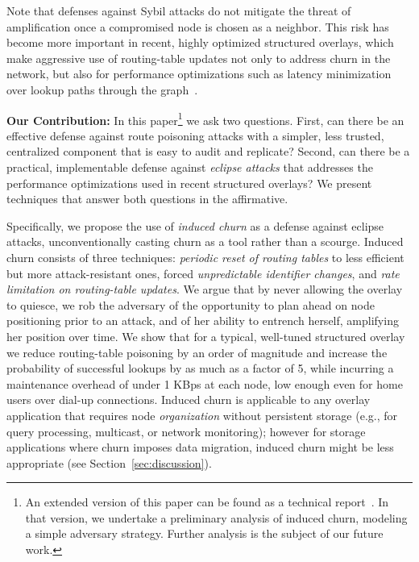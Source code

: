 \documentclass[10pt,twocolumn]{article}
\renewcommand{\paragraph}[1]{\textbf{#1:}}
\begin{document}
Note that defenses against Sybil attacks do not mitigate the threat of
amplification once a compromised node is chosen as a neighbor.  This
risk has become more important in recent, highly optimized structured overlays,
which make aggressive use of routing-table updates not only to address
churn in the network,
but also for performance optimizations such as latency
minimization over lookup paths through the graph~\cite{Gummadi2003b,Rhea2004}.

\paragraph{Our Contribution}
In this paper\footnote{An extended version of this paper can be found as
  a technical report~\cite{Condie:EECS-2005-11}.  In that version, we
  undertake a
  preliminary analysis of induced churn, modeling a simple adversary
  strategy.  Further analysis is the subject of our future work.} we ask
  two questions.  First, can there be an
effective defense against route poisoning attacks with a simpler, less trusted,
 centralized component that is easy to audit and replicate? Second, can
there be a practical, implementable defense against \emph{eclipse attacks} that
addresses the performance optimizations used in recent structured overlays?  We
present techniques that answer both questions in the affirmative.

Specifically, we propose the use of \emph{induced churn}
as a defense against eclipse attacks, unconventionally casting churn as
a tool rather than a scourge.  Induced churn consists of three
techniques: \emph{periodic reset of routing tables} to less efficient but more
attack-resistant ones,  forced \emph{unpredictable identifier changes},
and \emph{rate limitation on routing-table updates}.  We argue that by never allowing the overlay to
quiesce, we rob the adversary of the opportunity to plan ahead on node
positioning prior to an attack, and of her
ability to entrench herself, amplifying her position over time.
We show that for a typical, well-tuned structured overlay we reduce
routing-table poisoning by an order of magnitude and increase the
probability of successful lookups by as much as a factor
of 5, while incurring a maintenance overhead of under 1 KBps at each
node, low enough even for home users over dial-up connections.
Induced churn is applicable to any overlay application
that requires node \emph{organization} without persistent storage (e.g., for
query processing, multicast, or network monitoring); however for storage applications where churn
imposes data migration, induced churn
might be less appropriate (see Section~\ref{sec:discussion}).
\end{document}
